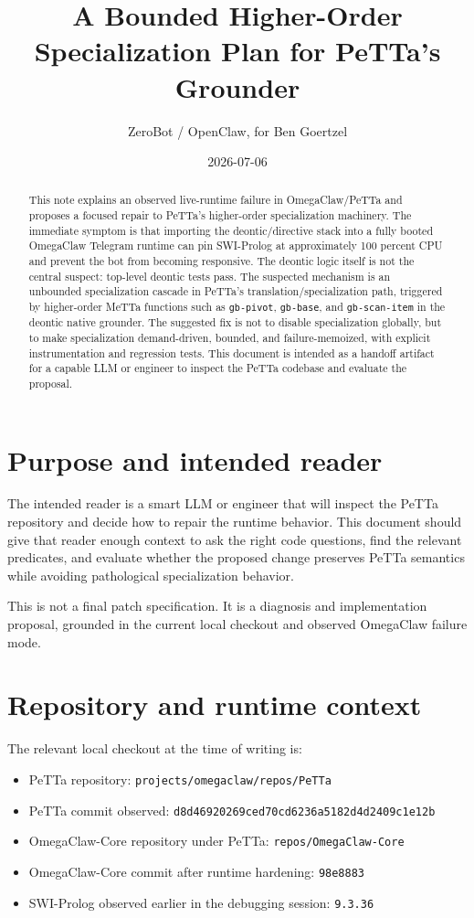 \documentclass[11pt]{article}
\title{A Bounded Higher-Order Specialization Plan for PeTTa's Grounder}
\author{ZeroBot / OpenClaw, for Ben Goertzel}
\date{2026-07-06}
\begin{document}
\maketitle

\begin{abstract}
This note explains an observed live-runtime failure in OmegaClaw/PeTTa and proposes a focused repair to PeTTa's higher-order specialization machinery. The immediate symptom is that importing the deontic/directive stack into a fully booted OmegaClaw Telegram runtime can pin SWI-Prolog at approximately 100 percent CPU and prevent the bot from becoming responsive. The deontic logic itself is not the central suspect: top-level deontic tests pass. The suspected mechanism is an unbounded specialization cascade in PeTTa's translation/specialization path, triggered by higher-order MeTTa functions such as \texttt{gb-pivot}, \texttt{gb-base}, and \texttt{gb-scan-item} in the deontic native grounder. The suggested fix is not to disable specialization globally, but to make specialization demand-driven, bounded, and failure-memoized, with explicit instrumentation and regression tests. This document is intended as a handoff artifact for a capable LLM or engineer to inspect the PeTTa codebase and evaluate the proposal.
\end{abstract}

\section{Purpose and intended reader}

The intended reader is a smart LLM or engineer that will inspect the PeTTa repository and decide how to repair the runtime behavior. This document should give that reader enough context to ask the right code questions, find the relevant predicates, and evaluate whether the proposed change preserves PeTTa semantics while avoiding pathological specialization behavior.

This is not a final patch specification. It is a diagnosis and implementation proposal, grounded in the current local checkout and observed OmegaClaw failure mode.

\section{Repository and runtime context}

The relevant local checkout at the time of writing is:

\begin{itemize}[nosep]
\item PeTTa repository: \texttt{projects/omegaclaw/repos/PeTTa}
\item PeTTa commit observed: \texttt{d8d46920269ced70cd6236a5182d4d2409c1e12b}
\item OmegaClaw-Core repository under PeTTa: \texttt{repos/OmegaClaw-Core}
\item OmegaClaw-Core commit after runtime hardening: \texttt{98e8883}
\item SWI-Prolog observed earlier in the debugging session: \texttt{9.3.36}
\end{itemize}
\end{document}
